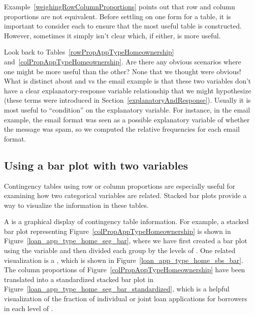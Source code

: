 Example~\ref{weighingRowColumnProportions} points out
that row and column proportions are not equivalent.
Before settling on one form for a table,
it is important to consider each to ensure that the
most useful table is constructed.
However, sometimes it simply isn't clear which, if either,
is more useful.

\begin{example}{Look back to
    Tables~\ref{rowPropAppTypeHomeownership}
    and~\ref{colPropAppTypeHomeownership}.
    Are there any obvious scenarios where one might be more
    useful than the other?}
  None that we thought were obvious!
  What is distinct about 
  and  vs the email example is that
  these two variables don't have a clear explanatory-response
  variable relationship that we might hypothesize
  (these terms were introduced in
    Section~\ref{explanatoryAndResponse}).
  Usually it is most useful to ``condition'' on the
  explanatory variable.
  For instance, in the email example, the email format
  was seen as a possible explanatory variable of whether
  the message was spam, so we computed the relative
  frequencies for each email format.
\end{example}



\subsection{Using a bar plot with two variables}
\label{bar_plots_subsection}

Contingency tables using row or column proportions
are especially useful for examining how two categorical
variables are related.
Stacked bar plots provide a way to visualize
the information in these tables.

A 
is a graphical display of contingency table information.
For example, a stacked bar plot representing
Figure~\ref{colPropAppTypeHomeownership}
is shown in Figure~\ref{loan_app_type_home_seg_bar},
where we have first created a bar plot using the
 variable and then divided each group
by the levels of .
One related visualization is a
,
which is shown in
Figure~\ref{loan_app_type_home_sbs_bar}.
The column proportions of
Figure~\ref{colPropAppTypeHomeownership}
have been translated into a standardized stacked bar plot
in Figure~\ref{loan_app_type_home_seg_bar_standardized},
which is a helpful visualization of the fraction of individual
or joint loan applications for borrowers in each level of
.



